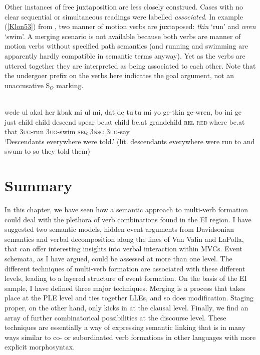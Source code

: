 Other instances of free juxtaposition are less closely construed. Cases with no clear sequential or simultaneous readings were labelled \textit{associated}. In example (\ref{Klon53}) from , two manner of motion verbs are juxtaposed: \textit{tkin} `run' and \textit{wren} `swim'. A merging scenario is not available because both verbs are manner of motion verbs without specified path semantics (and running and swimming are apparently hardly compatible in semantic terms anyway). Yet as the verbs are uttered together they are interpreted as being associated to each other. Note that the undergoer prefix on the verbs here indicates the goal argument, not an unaccusative S$_O$ marking. 

\ea \label{Klon53}
\\
\gll wede ul akal her kbak mi ul mi, dat de tu$~$tu mi yo ge-tkin ge-wren, bo ini ge \\
just child child descend spear be.at child be.at grandchild \textsc{rel} \textsc{red}$~$where be.at that 3\textsc{ug}-run 3\textsc{ug}-swim \textsc{seq} 3\textsc{nsg} 3\textsc{ug}-say \\
\glft `Descendants everywhere were told.' (lit. descendants everywhere were run to and swum to so they told them) \\ 
\z

\section{Summary} \label{sec:sum-sem}

In this chapter, we have seen how a semantic approach to multi-verb formation could deal with the plethora of verb combinations found in the EI region. I have suggested two semantic models, hidden event arguments from Davidsonian semantics and verbal decomposition along the lines of Van Valin and LaPolla, that can offer interesting insights into verbal interaction within MVCs. Event schemata, as I have argued, could be assessed at more than one level. The different techniques of multi-verb formation are associated with these different levels, leading to a layered structure of event formation. On the basis of the EI sample, I have defined three major techniques. Merging is a process that takes place at the PLE level and ties together LLEs, and so does modification. Staging proper, on the other hand, only kicks in at the clausal level. Finally, we find an array of further combinatorical possibilities at the discourse level. These techniques are essentially a way of expressing semantic linking that is in many ways similar to co- or subordinated verb formations in other languages with more explicit morphosyntax.

